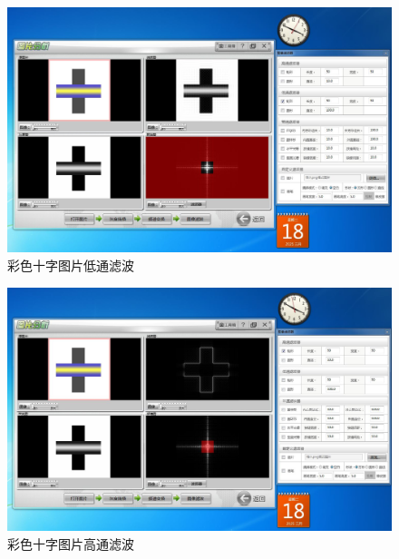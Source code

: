 \documentclass[11pt]{article}
\begin{document}
\begin{enumerate}
    \begin{figure}[H]
        \centering
        \includegraphics[width=15cm]{Fig/图17 彩色十字图片低通滤波.JPG}
        \caption{彩色十字图片低通滤波}
    \end{figure}
    \begin{figure}[H]
        \centering
        \includegraphics[width=15cm]{Fig/图18 彩色十字图片高通滤波.JPG}
        \caption{彩色十字图片高通滤波}
    \end{figure}


\end{enumerate}
\end{document}
